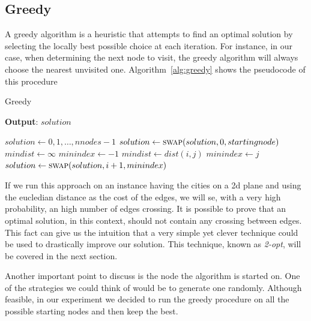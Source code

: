 \documentclass{article}
\begin{document}
\subsection{Greedy}
A greedy algorithm is a heuristic that attempts to find an optimal solution by selecting the locally best possible choice at each iteration.
For instance, in our case, when determining the next node to visit, the greedy algorithm will always choose
the nearest unvisited one. Algorithm~\ref{alg:greedy} shows the pseudocode of this procedure

\begin{algorithm}[ht]
\caption{Greedy}
\label{alg:greedy}
\hspace*{0.5em} \textbf{Output}: $solution$
\begin{algorithmic}
	\State $solution \gets {0, 1, \dots, nnodes - 1}$
	\State $solution \gets \Call{swap}{solution, 0, startingnode}$
                \State $mindist \gets \infty$
                \State $minindex \gets -1$
                                \State $mindist \gets dist(i, j)$
                                \State $minindex \gets j$
                        \EndIf
                \EndFor
                \State $solution \gets \Call{swap}{solution, i + 1, minindex}$
        \EndFor
\EndProcedure
\end{algorithmic}
\end{algorithm}
If we run this approach on an instance having the cities on a 2d plane and using the
eucledian distance as the cost of the edges, we will se, with a very high probability, an
high number of edges crossing.
It is possible to prove that an optimal solution, in this context, should not contain any crossing
between edges.
This fact can give us the intuition that a very simple yet clever technique could be used
to drastically improve our solution. This technique, known as \textit{2-opt}, will be covered
in the next section.

Another important point to discuss is the node the algorithm is started on.
One of the strategies we could think of would be to generate one randomly.
Although feasible, in our experiment we decided to run the greedy procedure
on all the possible starting nodes and then keep the best.
\end{document}
